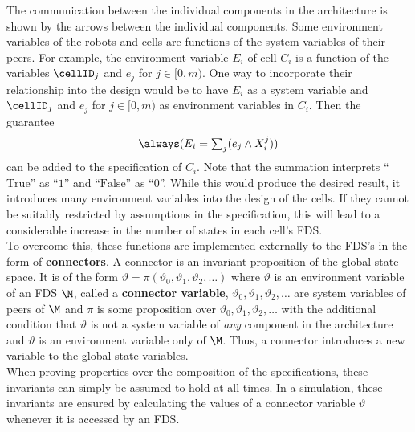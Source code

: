 The communication between the individual components in the architecture is shown by the arrows between the individual components. Some environment variables of the robots and cells are functions of the system variables of their peers. For example, the environment variable $E_i$ of cell $C_i$ is a function of the variables $\cellID_j$ and $e_j$ for $j \in [0, m)$. One way to incorporate their relationship into the design would be to have $E_i$ as a system variable and $\cellID_j$ and $e_j$ for $j \in [0, m)$ as environment variables in $C_i$. Then the guarantee
\begin{equation*}
  \always(\connE{i})
\end{equation*}
can be added to the specification of $C_i$. Note that the summation interprets ``$\mathrm{True}$'' as ``$1$'' and ``$\mathrm{False}$'' as ``$0$''. While this would produce the desired result, it introduces many environment variables into the design of the cells. If they cannot be suitably restricted by assumptions in the specification, this will lead to a considerable increase in the number of states in each cell's FDS.\\

To overcome this, these functions are implemented externally to the FDS's in the form of {\bf connectors}. A connector is an invariant proposition of the global state space. It is of the form $\vartheta = \pi(\vartheta_0, \vartheta_1, \vartheta_2, \ldots)$ where $\vartheta$ is an environment variable of an FDS $\M$, called a {\bf connector variable}, $\vartheta_0, \vartheta_1, \vartheta_2, \ldots$ are system variables of peers of $\M$ and $\pi$ is some proposition over $\vartheta_0, \vartheta_1, \vartheta_2, \ldots$ with the additional condition that $\vartheta$ is not a system variable of \emph{any} component in the architecture and $\vartheta$ is an environment variable only of $\M$. Thus, a connector introduces a new variable to the global state variables.\\

When proving properties over the composition of the specifications, these invariants can simply be assumed to hold at all times. In a simulation, these invariants are ensured by calculating the values of a connector variable $\vartheta$ whenever it is accessed by an FDS.\\

